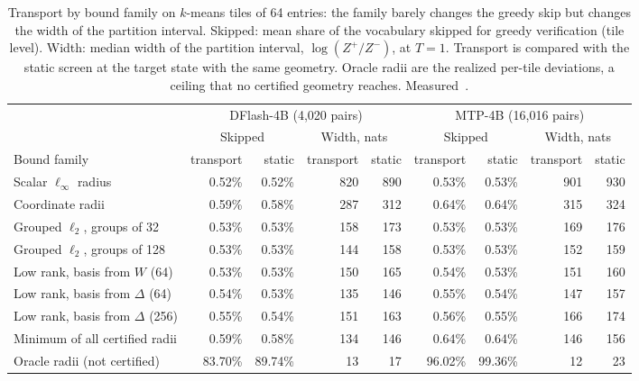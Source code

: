 \begin{table}[htbp]
\tablefont\centering
\caption{Transport by bound family on $k$-means tiles of 64 entries: the family barely changes the greedy skip but changes the width of the partition interval. Skipped: mean share of the vocabulary skipped for greedy verification (tile level). Width: median width of the partition interval, $\log(Z^+/Z^-)$, at $T=1$. Transport is compared with the static screen at the target state with the same geometry. Oracle radii are the realized per-tile deviations, a ceiling that no certified geometry reaches. Measured~.}
\label{tab:transport-families}
\vskip 0.05in
\begin{tabular}{@{}lrrrrrrrr@{}}\toprule
& \multicolumn{4}{c}{DFlash-4B (4,020 pairs)} & \multicolumn{4}{c}{MTP-4B (16,016 pairs)}\\\cmidrule(lr){2-5}\cmidrule(l){6-9}
& \multicolumn{2}{c}{Skipped} & \multicolumn{2}{c}{Width, nats} & \multicolumn{2}{c}{Skipped} & \multicolumn{2}{c}{Width, nats}\\\cmidrule(lr){2-3}\cmidrule(lr){4-5}\cmidrule(lr){6-7}\cmidrule(l){8-9}
Bound family & transport & static & transport & static & transport & static & transport & static\\\midrule
Scalar $\ell_\infty$ radius & 0.52\% & 0.52\% & 820 & 890 & 0.53\% & 0.53\% & 901 & 930\\
Coordinate radii & 0.59\% & 0.58\% & 287 & 312 & 0.64\% & 0.64\% & 315 & 324\\
Grouped $\ell_2$, groups of 32 & 0.53\% & 0.53\% & 158 & 173 & 0.53\% & 0.53\% & 169 & 176\\
Grouped $\ell_2$, groups of 128 & 0.53\% & 0.53\% & 144 & 158 & 0.53\% & 0.53\% & 152 & 159\\
Low rank, basis from $W$ (64) & 0.53\% & 0.53\% & 150 & 165 & 0.54\% & 0.53\% & 151 & 160\\
Low rank, basis from $\Delta$ (64) & 0.54\% & 0.53\% & 135 & 146 & 0.55\% & 0.54\% & 147 & 157\\
Low rank, basis from $\Delta$ (256) & 0.55\% & 0.54\% & 151 & 163 & 0.56\% & 0.55\% & 166 & 174\\
Minimum of all certified radii & 0.59\% & 0.58\% & 134 & 146 & 0.64\% & 0.64\% & 146 & 156\\\addlinespace
Oracle radii (not certified) & 83.70\% & 89.74\% & 13 & 17 & 96.02\% & 99.36\% & 12 & 23\\\bottomrule
\end{tabular}
\end{table}

